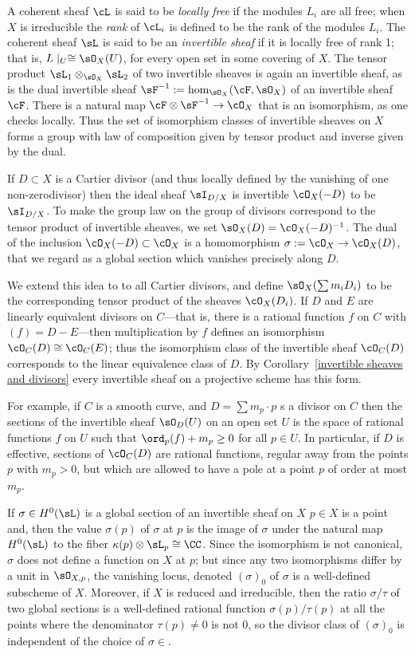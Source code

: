 A coherent sheaf $\cL$ is said to be \emph{locally free} if the modules $L_i$ are all free; when $X$ is irreducible the \emph{rank} of $\cL_i$ is defined to be the rank of the modules $L_i$.
The coherent sheaf $\sL$ is said to be an \emph{invertible sheaf} if it is locally free of rank 1; that is, $L\mid_U \cong \sO_X(U)$,
for every open set in some covering of $X$. The tensor product  $\sL_1\otimes_{\sO_X}\sL_2$ of two invertible sheaves is  again an invertible sheaf, as is the dual invertible sheaf $\sF^{-1} := \hom_{\sO_X}(\cF,\sO_X)$ of an invertible sheaf $\cF$. There is a natural map
$\cF \otimes \sF^{-1} \to \cO_X$ that is an isomorphism, as one checks locally. Thus the set of isomorphism classes of invertible sheaves on $X$ forms a group with law of composition given by tensor product and inverse given by the dual.

If $D\subset X$ is a Cartier divisor (and thus locally defined by the vanishing of one non-zerodivisor) then the ideal sheaf $\sI_{D/X}$
is invertible $\cO_X(-D)$ to be $\sI_{D/X}$. To make the group law on the group of divisors correspond to the
tensor product of invertible sheaves, we set $\sO_X(D) =\cO_X(-D)^{-1}$. The dual of the inclusion
$\cO_X(-D) \subset \cO_X$ is a homomorphism $\sigma := \cO_X \to \cO_X(D)$, that we regard as a global section which
vanishes precisely along $D$. 

We extend this idea to to all Cartier divisors, and define $\sO_X(\sum m_iD_i)$ to be the corresponding tensor
product of the sheaves $\cO_X(D_i)$. If $D$ and $E$ are linearly equivalent divisors on $C$---that is, there is a rational function $f$ on $C$ with $(f) = D - E$---then multiplication by $f$ defines an isomorphism $\cO_C(D) \cong \cO_C(E)$; thus the isomorphism class of the invertible sheaf $\cO_C(D)$ corresponds to the linear equivalence class of $D$. By Corollary~\ref{invertible sheaves and divisors} every invertible sheaf on a projective scheme has this form.

For example, if $C$ is a smooth curve, and $D = \sum m_p\cdot p$ s a divisor on $C$ then the sections of the invertible sheaf
$\sO_D(U)$ on an open set $U$ is the space of rational functions $f$ on $U$ such that $\ord_p(f) + m_p \geq 0$ for all $p \in U$. 
In particular, if $D$ is effective, sections of $\cO_C(D)$ are rational functions, regular away from the points $p$ with $m_p > 0$, but which are allowed to have a pole at a point $p$ of order at most $m_p$. 

If $\sigma\in H^0(\sL)$ is a global section of an invertible sheaf on $X$  $p\in X$ is a point and, then the value $\sigma(p)$ of $\sigma$ at $p$ is the image  of $\sigma$ under the natural map $H^0(\sL)$ to the fiber $\kappa(p) \otimes \sL_{p} \cong \CC$.
Since the isomorphism is not canonical, $\sigma$ does not define a function on $X$ at $p$; but since any two isomorphisms
differ by a unit in $\sO_{X,p}$, the vanishing locus, denoted $(\sigma)_0$ of $\sigma$ is a well-defined subscheme of $X$. Moreover, if $X$ is reduced and irreducible, then the ratio $\sigma/\tau$ of two global sections is a well-defined rational function
$\sigma(p)/\tau(p)$ at all the points where the denominator $\tau(p)\neq 0$ is not 0, so the divisor class of 
$(\sigma)_0$ is independent of the choice of $\sigma \in $.

